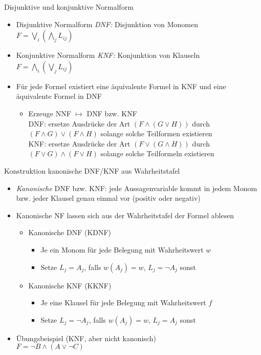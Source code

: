\begin{frame}{Disjunktive und konjunktive Normalform}
	\begin{itemize}
		\item Disjunktive Normalform \emph{DNF:} Disjunktion von Monomen\\
		$F=\bigvee_i\left(\bigwedge_jL_{ij}\right)$
		\item Konjunktive Normalform \emph{KNF:} Konjunktion von Klauseln\\
		$F=\bigwedge_i\left(\bigvee_jL_{ij}\right)$
		\item Für jede Formel existiert eine äquivalente Formel in KNF und eine äquivalente Formel in DNF
		\begin{itemize}
			\item Erzeuge NNF $\mapsto$ DNF bzw. KNF\\
			DNF: ersetze Ausdrücke der Art $(F \land (G \lor H))$ durch $(F \land G) \lor (F \land H)$ solange solche Teilformen existieren\\
			KNF: ersetze Ausdrücke der Art $(F \lor (G \land H))$ durch $(F \lor G) \land (F \lor H)$ solange solche Teilformeln existieren
		\end{itemize}
	\end{itemize}
\end{frame}

\begin{frame}{Konstruktion kanonische DNF/KNF aus Wahrheitstafel}
	\begin{itemize}
		\item \emph{Kanonische} DNF bzw. KNF: jede Aussagenvariable kommt in jedem Monom bzw. jeder Klausel genau einmal vor (positiv oder negativ)
		\item Kanonische NF lassen sich aus der Wahrheitstafel der Formel ablesen
		\begin{itemize}
			\item Kanonische DNF (KDNF)
			\begin{itemize}
				\item Je ein Monom für jede Belegung mit Wahrheitswert $w$
				\item Setze $L_j=A_j$, falls $w(A_j)=w$, $L_j=\neg A_j$ sonst
			\end{itemize}
			\item Kanonische KNF (KKNF)
			\begin{itemize}
				\item Je eine Klausel für jede Belegung mit Wahrheitswert $f$
				\item Setze $L_j=\neg A_j$, falls $w(A_j)=w$, $L_j=A_j$ sonst
			\end{itemize}
		\end{itemize}
		\item Übungsbeispiel (KNF, aber nicht kanonisch)\\
		$F=\neg B \land (A \lor \neg C)$
	\end{itemize}
\end{frame}

